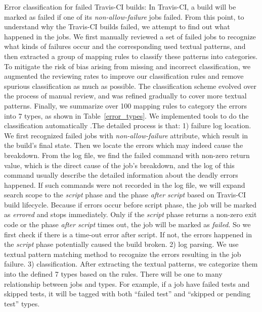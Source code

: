 
Error classification for failed Travis-CI builds: 
In Travis-CI, a build will be marked as failed if one of its \textit{non-allow-failure} jobs failed. From this point, to understand why the Travis-CI builds failed, we attempt to find out what happened in the jobs. We first manually reviewed a set of failed jobs to recognize what kinds of failures occur and the corresponding used textual patterns, and then extracted a group of mapping rules to classify these patterns into categories. To mitigate the risk of bias arising from missing and incorrect classification, we augmented the reviewing rates to improve our classification rules and remove spurious classification as much as possible. The classification scheme evolved over the process of manual review, and was refined gradually to cover more textual patterns. Finally, we summarize over 100 mapping rules to category the errors into 7 types, as shown in Table~\ref{error_types}. 
We implemented tools to do the classification automatically .The detailed process is that: 1) failure log location. We first recognized failed jobs with \textit{non-allow-failure} attribute, which result in the build's final state. Then we locate the errors which may indeed cause the breakdown. From the log file, we find the failed command with non-zero return value, which is the direct cause of the job’s breakdown, and the log of this command usually describe the detailed information about the deadly errors happened. If such commands were not recorded in the log file, we will expand search scope to the \textit{script} phase and the phase \textit{after script} based on Travis-CI build lifecycle. Because if errors occur before script phase, the job will be marked as \textit{errored} and stops immediately. Only if the \textit{script} phase returns a non-zero exit code or the phase \textit{after script} times out, the job will be marked as \textit{failed}. So we first check if there is a time-out error after script. If not, the errors happened in the \textit{script} phase potentially caused the build broken. 2) log parsing. We use textual pattern matching method to recognize the errors resulting in the job failure. 3) classification. After extracting the textual patterns, we categorize them  into the defined 7 types based on the rules. There will be one to many relationship between jobs and types. For example, if a job have failed tests and skipped tests, it will be tagged with both “failed test” and “skipped or pending test” types.


